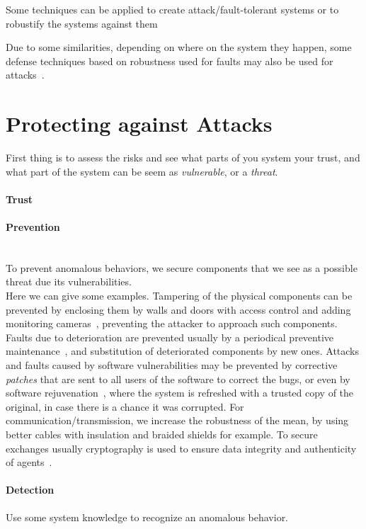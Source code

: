 \documentclass[../main.tex]{subfiles}
\begin{document}
Some techniques can be applied to create attack/fault-tolerant systems or to robustify the systems against them\cite{DingEtAl2018,SatchidanandanKumar2017}

Due to some similarities, depending on where on the system they happen, some defense techniques based on robustness used for faults may also be used for attacks~\cite{TeixeiraEtAl2015}.



\section{Protecting against Attacks}\label{sec:protecting_against_attacks}
First thing is to assess the risks and see what parts of you system your trust, and what part of the system can be seem as \emph{vulnerable}, or a \emph{threat}.


\paragraph{Trust}

\paragraph{Prevention}
~\\To prevent anomalous behaviors, we secure components that we see as a possible threat due its vulnerabilities.
\\Here we can give some examples.
Tampering of the physical components can be prevented by enclosing them by walls and doors with access control and adding monitoring cameras~\cite{CardenasEtAl2008,DingEtAl2018}, preventing the attacker to approach such components.
Faults due to deterioration are prevented usually by a periodical preventive maintenance~\cite{ChenEtAl2021}, and substitution of deteriorated components by new ones.
Attacks and faults caused by software vulnerabilities may be prevented by corrective \emph{patches} that are sent to all users of the software to correct the bugs, or even by software rejuvenation~\cite{GriffioenEtAl2020}, where the system is refreshed with a trusted copy of the original, in case there is a chance it was corrupted.
For communication/transmission, we increase the robustness of the mean, by using better cables with insulation and braided shields for example.
To secure exchanges usually cryptography is used to ensure data integrity and authenticity of agents~\cite{DingEtAl2018}.

\paragraph{Detection}
Use some system knowledge to recognize an anomalous behavior.
\end{document}
